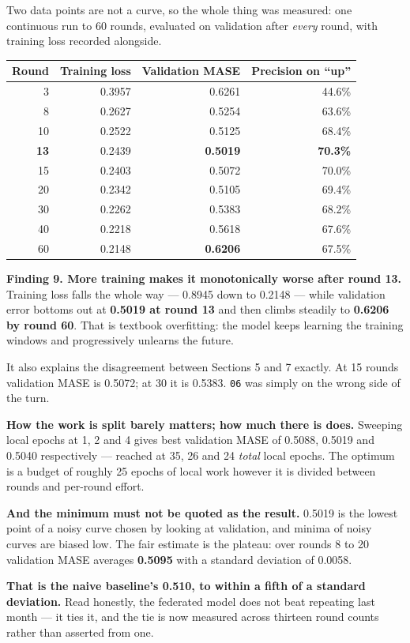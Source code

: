 \documentclass[11pt,a4paper]{article}
\newcommand{\keypoint}[1]{%
  \par\vspace{0.4em}%
  \noindent\colorbox{fed!8}{\parbox{0.98\textwidth}{\vspace{0.2em}#1\vspace{0.2em}}}%
  \par\vspace{0.4em}}
\begin{document}
Two data points are not a curve, so the whole thing was measured: one continuous run to 60 rounds,
evaluated on validation after \emph{every} round, with training loss recorded alongside.

\begin{center}
\small
\begin{tabular}{@{}rrrr@{}}
\toprule
\textbf{Round} & \textbf{Training loss} & \textbf{Validation MASE} & \textbf{Precision on ``up''} \\
\midrule
3 & 0.3957 & 0.6261 & 44.6\% \\
8 & 0.2627 & 0.5254 & 63.6\% \\
10 & 0.2522 & 0.5125 & 68.4\% \\
\textbf{13} & 0.2439 & \textbf{0.5019} & \textbf{70.3\%} \\
15 & 0.2403 & 0.5072 & 70.0\% \\
20 & 0.2342 & 0.5105 & 69.4\% \\
30 & 0.2262 & 0.5383 & 68.2\% \\
40 & 0.2218 & 0.5618 & 67.6\% \\
60 & 0.2148 & \textbf{0.6206} & 67.5\% \\
\bottomrule
\end{tabular}
\end{center}

\keypoint{\textbf{Finding 9. More training makes it monotonically worse after round 13.} Training loss
falls the whole way --- 0.8945 down to 0.2148 --- while validation error bottoms out at
\textbf{0.5019 at round 13} and then climbs steadily to \textbf{0.6206 by round 60}. That is textbook
overfitting: the model keeps learning the training windows and progressively unlearns the future.

It also explains the disagreement between Sections 5 and 7 exactly. At 15 rounds validation MASE is
0.5072; at 30 it is 0.5383. \texttt{06} was simply on the wrong side of the turn.}

\textbf{How the work is split barely matters; how much there is does.} Sweeping local epochs at 1, 2
and 4 gives best validation MASE of 0.5088, 0.5019 and 0.5040 respectively --- reached at 35, 26 and 24
\emph{total} local epochs. The optimum is a budget of roughly 25 epochs of local work however it is
divided between rounds and per-round effort.

\keypoint{\textbf{And the minimum must not be quoted as the result.} 0.5019 is the lowest point of a
noisy curve chosen by looking at validation, and minima of noisy curves are biased low. The fair
estimate is the plateau: over rounds 8 to 20 validation MASE averages \textbf{0.5095} with a standard
deviation of 0.0058.

\textbf{That is the naive baseline's 0.510, to within a fifth of a standard deviation.} Read honestly,
the federated model does not beat repeating last month --- it ties it, and the tie is now measured
across thirteen round counts rather than asserted from one.}
\end{document}
